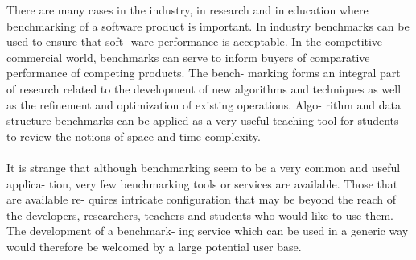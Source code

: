 There are many cases in the industry, in research and in education where benchmarking of
a software product is important. In industry benchmarks can be used to ensure that soft-
ware performance is acceptable. In the competitive commercial world, benchmarks can
serve to inform buyers of comparative performance of competing products. The bench-
marking forms an integral part of research related to the development of new algorithms
and techniques as well as the refinement and optimization of existing operations. Algo-
rithm and data structure benchmarks can be applied as a very useful teaching tool for
students to review the notions of space and time complexity.\\ \\
It is strange that although benchmarking seem to be a very common and useful applica-
tion, very few benchmarking tools or services are available. Those that are available re-
quires intricate configuration that may be beyond the reach of the developers, researchers,
teachers and students who would like to use them. The development of a benchmark-
ing service which can be used in a generic way would therefore be welcomed by a large
potential user base.
